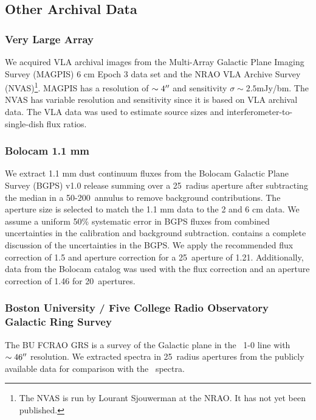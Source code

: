 \subsection{Other Archival Data}

\subsubsection{Very Large Array}
We acquired VLA archival images from the Multi-Array Galactic Plane Imaging
Survey (MAGPIS) 6 cm Epoch 3 data set \citep{Becker2005} and the NRAO VLA
Archive Survey (NVAS)\footnote{The NVAS is run by Lourant Sjouwerman at the
NRAO.  It has not yet been published.}.  MAGPIS has a resolution of
$\sim4\mbox{$^{\prime\prime}$}$ and sensitivity $\sigma\sim 2.5 $mJy/bm.  The NVAS has variable
resolution and sensitivity since it is based on VLA archival data.  The VLA
data was used to estimate source sizes and interferometer-to-single-dish flux
ratios.

\subsubsection{ Bolocam 1.1 mm }
We extract 1.1 mm dust continuum fluxes from the Bolocam Galactic Plane Survey
(BGPS) v1.0 release summing over a 25\arcsec\ radius aperture after subtracting
the median in a 50-200\arcsec\ annulus to remove background
contributions. The aperture size is selected to match the 1.1 mm data to the 
2 and 6 cm data.  We assume a uniform 50\% systematic error in BGPS fluxes from
combined uncertainties in the calibration and background subtraction.
\citet{Aguirre2011} contains a complete discussion of the uncertainties in the
BGPS. 
We apply the
\citet{Aguirre2011} recommended flux correction of 1.5 and aperture correction
for a 25\arcsec\ aperture of 1.21.  Additionally, data from the Bolocam catalog
\citep{Rosolowsky2010} was used with the flux correction and an aperture correction
of 1.46 for 20\arcsec\ apertures.

\subsubsection{Boston University / Five College Radio Observatory Galactic Ring Survey}
The BU FCRAO GRS \citep{Jackson2006} is a survey of the Galactic plane in the
\thirteenco\ 1-0 line with $\sim 46\mbox{$^{\prime\prime}$}$ resolution.  We extracted spectra in 25\arcsec\ radius
apertures from the publicly available data for comparison with the \formaldehyde\ spectra.

